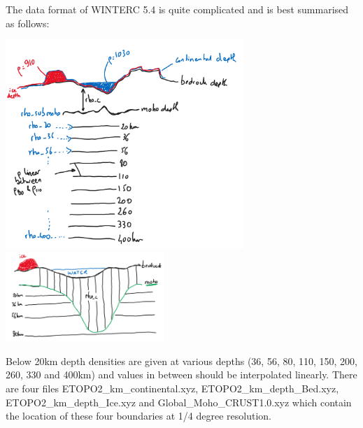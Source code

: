 
The data format of WINTERC 5.4 is quite complicated and is best summarised as follows:

\begin{center}
\includegraphics[width=9cm]{python_codes/fieldstone_99/images/whiteboard}
\includegraphics[width=6cm]{python_codes/fieldstone_99/images/whiteboard2}
\end{center}

Below 20km depth densities are given at various depths (36, 56, 80, 110, 150, 200, 260, 330 and 400km)
and values in between should be interpolated linearly. 
There are four files
{\asciifile ETOPO2\_km\_continental.xyz}, 
{\asciifile ETOPO2\_km\_depth\_Bed.xyz}, 
{\asciifile ETOPO2\_km\_depth\_Ice.xyz} and 
{\asciifile Global\_Moho\_CRUST1.0.xyz}
which contain the location of these four boundaries at 1/4 degree resolution. 


